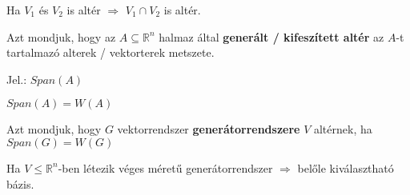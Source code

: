 	\begin{frame}
		\begin{tcolorbox}[title={Tétel: Alterek metszete}]
			Ha $V_1$ és $V_2$ is altér $\Rightarrow$ $V_1 \cap V_2$ is altér.
		\end{tcolorbox}
		
		\begin{tcolorbox}[title={Def.: Span}]
			Azt mondjuk, hogy az $A \subseteq \mathbb{R}^n$ halmaz által \textbf{generált / kifeszített altér} az $A$-t tartalmazó alterek / vektorterek metszete.\\
			\msmallskip
			
			Jel.: $Span(A)$
		\end{tcolorbox}
		
		\begin{tcolorbox}[title={Tétel: Span és Lineáris burok}]
			$Span(A) = W(A)$
		\end{tcolorbox}
		
		\begin{tcolorbox}[title={Def.: Generátorrendszer}]
			Azt mondjuk, hogy $G$ vektorrendszer \textbf{generátorrendszere} $V$ altérnek, ha $Span(G) = W(G)$
		\end{tcolorbox}
		
		\begin{tcolorbox}[title={Tétel.: Generátorrendszer létezése}]
			Ha $V \leq \mathbb{R}^n$-ben létezik véges méretű generátorrendszer $\Rightarrow$ belőle kiválasztható bázis.
		\end{tcolorbox}
	\end{frame}
	
